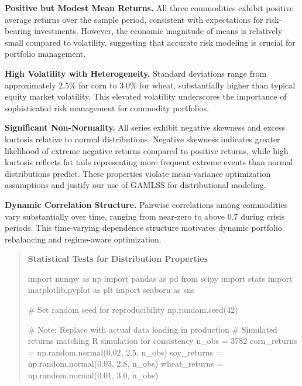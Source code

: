 \documentclass[
  10pt,
  a4paper,
]{article}
\newenvironment{Shaded}{\begin{snugshade}}{\end{snugshade}}
\newcommand{\CommentTok}[1]{\textcolor[rgb]{0.37,0.37,0.37}{#1}}
\newcommand{\DecValTok}[1]{\textcolor[rgb]{0.68,0.00,0.00}{#1}}
\newcommand{\FloatTok}[1]{\textcolor[rgb]{0.68,0.00,0.00}{#1}}
\newcommand{\ImportTok}[1]{\textcolor[rgb]{0.00,0.46,0.62}{#1}}
\newcommand{\NormalTok}[1]{\textcolor[rgb]{0.00,0.23,0.31}{#1}}
\newcommand{\OperatorTok}[1]{\textcolor[rgb]{0.37,0.37,0.37}{#1}}
\begin{document}
\begin{tcolorbox}
\textbf{Positive but Modest Mean Returns.} All three commodities exhibit
positive average returns over the sample period, consistent with
expectations for risk-bearing investments. However, the economic
magnitude of means is relatively small compared to volatility,
suggesting that accurate risk modeling is crucial for portfolio
management.

\textbf{High Volatility with Heterogeneity.} Standard deviations range
from approximately 2.5\% for corn to 3.0\% for wheat, substantially
higher than typical equity market volatility. This elevated volatility
underscores the importance of sophisticated risk management for
commodity portfolios.

\textbf{Significant Non-Normality.} All series exhibit negative skewness
and excess kurtosis relative to normal distributions. Negative skewness
indicates greater likelihood of extreme negative returns compared to
positive returns, while high kurtosis reflects fat tails representing
more frequent extreme events than normal distributions predict. These
properties violate mean-variance optimization assumptions and justify
our use of GAMLSS for distributional modeling.

\textbf{Dynamic Correlation Structure.} Pairwise correlations among
commodities vary substantially over time, ranging from near-zero to
above 0.7 during crisis periods. This time-varying dependence structure
motivates dynamic portfolio rebalancing and regime-aware optimization.

\begin{quote}
\textbf{Statistical Tests for Distribution Properties}

\begin{Shaded}
\begin{Highlighting}[]
\ImportTok{import}\NormalTok{ numpy }\ImportTok{as}\NormalTok{ np}
\ImportTok{import}\NormalTok{ pandas }\ImportTok{as}\NormalTok{ pd}
\ImportTok{from}\NormalTok{ scipy }\ImportTok{import}\NormalTok{ stats}
\ImportTok{import}\NormalTok{ matplotlib.pyplot }\ImportTok{as}\NormalTok{ plt}
\ImportTok{import}\NormalTok{ seaborn }\ImportTok{as}\NormalTok{ sns}

\CommentTok{\# Set random seed for reproducibility}
\NormalTok{np.random.seed(}\DecValTok{42}\NormalTok{)}

\CommentTok{\# Note: Replace with actual data loading in production}
\CommentTok{\# Simulated returns matching R simulation for consistency}
\NormalTok{n\_obs }\OperatorTok{=} \DecValTok{3782}
\NormalTok{corn\_returns }\OperatorTok{=}\NormalTok{ np.random.normal(}\FloatTok{0.02}\NormalTok{, }\FloatTok{2.5}\NormalTok{, n\_obs)}
\NormalTok{soy\_returns }\OperatorTok{=}\NormalTok{ np.random.normal(}\FloatTok{0.03}\NormalTok{, }\FloatTok{2.8}\NormalTok{, n\_obs)}
\NormalTok{wheat\_returns }\OperatorTok{=}\NormalTok{ np.random.normal(}\FloatTok{0.01}\NormalTok{, }\FloatTok{3.0}\NormalTok{, n\_obs)}


\end{Highlighting}
\end{Shaded}
\end{quote}
\end{tcolorbox}
\end{document}
